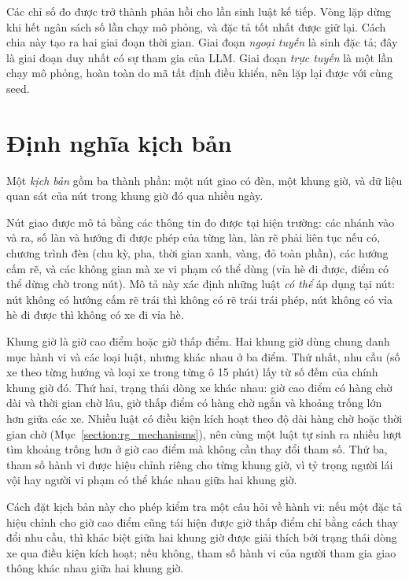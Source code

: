 \documentclass[../main.tex]{subfiles}
\begin{document}
Các chỉ số đo được trở thành phản hồi cho lần sinh luật kế tiếp. Vòng lặp dừng khi hết ngân sách số lần chạy mô phỏng, và đặc tả tốt nhất được giữ lại. Cách chia này tạo ra hai giai đoạn thời gian. Giai đoạn \emph{ngoại tuyến} là sinh đặc tả; đây là giai đoạn duy nhất có sự tham gia của LLM. Giai đoạn \emph{trực tuyến} là một lần chạy mô phỏng, hoàn toàn do mã tất định điều khiển, nên lặp lại được với cùng seed.

\section{Định nghĩa kịch bản}
\label{section:rg_scenario}

Một \emph{kịch bản} gồm ba thành phần: một nút giao có đèn, một khung giờ, và dữ liệu quan sát của nút trong khung giờ đó qua nhiều ngày.

Nút giao được mô tả bằng các thông tin đo được tại hiện trường: các nhánh vào và ra, số làn và hướng đi được phép của từng làn, làn rẽ phải liên tục nếu có, chương trình đèn (chu kỳ, pha, thời gian xanh, vàng, đỏ toàn phần), các hướng cấm rẽ, và các không gian mà xe vi phạm có thể dùng (vỉa hè đi được, điểm có thể dừng chờ trong nút). Mô tả này xác định những luật \emph{có thể} áp dụng tại nút: nút không có hướng cấm rẽ trái thì không có rẽ trái trái phép, nút không có vỉa hè đi được thì không có xe đi vỉa hè.

Khung giờ là giờ cao điểm hoặc giờ thấp điểm. Hai khung giờ dùng chung danh mục hành vi và các loại luật, nhưng khác nhau ở ba điểm. Thứ nhất, nhu cầu (số xe theo từng hướng và loại xe trong từng ô 15 phút) lấy từ số đếm của chính khung giờ đó. Thứ hai, trạng thái dòng xe khác nhau: giờ cao điểm có hàng chờ dài và thời gian chờ lâu, giờ thấp điểm có hàng chờ ngắn và khoảng trống lớn hơn giữa các xe. Nhiều luật có điều kiện kích hoạt theo độ dài hàng chờ hoặc thời gian chờ (Mục~\ref{section:rg_mechanisms}), nên cùng một luật tự sinh ra nhiều lượt tìm khoảng trống hơn ở giờ cao điểm mà không cần thay đổi tham số. Thứ ba, tham số hành vi được hiệu chỉnh riêng cho từng khung giờ, vì tỷ trọng người lái vội hay người vi phạm có thể khác nhau giữa hai khung giờ.

Cách đặt kịch bản này cho phép kiểm tra một câu hỏi về hành vi: nếu một đặc tả hiệu chỉnh cho giờ cao điểm cũng tái hiện được giờ thấp điểm chỉ bằng cách thay đổi nhu cầu, thì khác biệt giữa hai khung giờ được giải thích bởi trạng thái dòng xe qua điều kiện kích hoạt; nếu không, tham số hành vi của người tham gia giao thông khác nhau giữa hai khung giờ.
\end{document}
